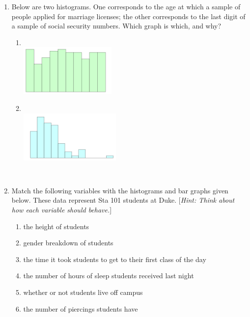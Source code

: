 \documentclass[12pt]{article}
\newcommand{\soln}[2]{$\:$\\ \vspace{#1}}{}
\begin{document}
\begin{enumerate}

\item Below are two histograms. One corresponds to the age at which a sample of people applied for marriage licenses; the other corresponds to the last digit of a sample of social security numbers. Which graph is which, and why?

\begin{multicols}{2}

\begin{enumerate}

\item $\:$ \\
\includegraphics[height=1in]{figures/last_digit_SSN}

\item $\:$ \\
\includegraphics[height=1in]{figures/age_mar_lic}

\end{enumerate}

\end{multicols}

\soln{-1cm}{(a) SSN, no pattern expected so uniform (b) age at first marriage, more people get married earlier}

%

\item Match the following variables with the histograms and bar graphs given below. These data represent Sta 101 students at Duke. [\textit{Hint: Think about how each variable should behave.}]

\begin{multicols}{2}
\begin{enumerate}
\item the height of students
\item gender breakdown of students
\item the time it took students to get to their first class of the day
\item the number of hours of sleep students received last night
\item whether or not students live off campus
\item the number of piercings students have
\end{enumerate}
\end{multicols}


\end{enumerate}
\end{document}
